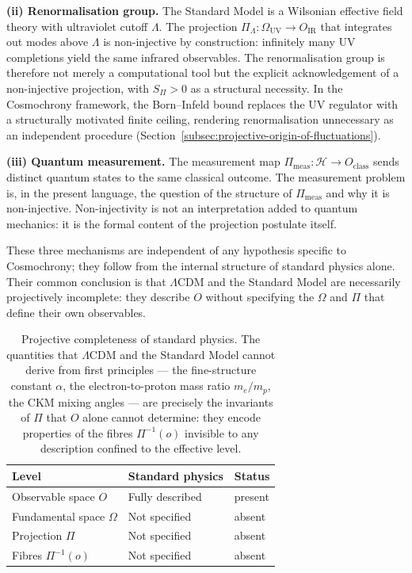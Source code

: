 \textbf{(ii) Renormalisation group.}
The Standard Model is a Wilsonian effective field theory with ultraviolet
cutoff $\Lambda$.
The projection $\Pi_\Lambda : \Omega_{\mathrm{UV}} \to O_{\mathrm{IR}}$
that integrates out modes above $\Lambda$ is non-injective by construction:
infinitely many UV completions yield the same infrared observables.
The renormalisation group is therefore not merely a computational tool but
the explicit acknowledgement of a non-injective projection, with $S_\Pi > 0$
as a structural necessity.
In the Cosmochrony framework, the Born--Infeld bound replaces the
UV regulator with a structurally motivated finite ceiling, rendering
renormalisation unnecessary as an independent procedure
(Section~\ref{subsec:projective-origin-of-fluctuations}).

\textbf{(iii) Quantum measurement.}
The measurement map $\Pi_{\mathrm{meas}} : \mathcal{H} \to O_{\mathrm{class}}$
sends distinct quantum states to the same classical outcome.
The measurement problem is, in the present language, the question of the
structure of $\Pi_{\mathrm{meas}}$ and why it is non-injective.
Non-injectivity is not an interpretation added to quantum mechanics: it is
the formal content of the projection postulate itself.

These three mechanisms are independent of any hypothesis specific to
Cosmochrony; they follow from the internal structure of standard physics
alone.
Their common conclusion is that $\Lambda$CDM and the Standard Model are
necessarily projectively incomplete: they describe $O$ without specifying
the $\Omega$ and $\Pi$ that define their own observables.

\begin{table}[ht]
  \centering
  \begin{tabular}{lll}
    \hline
    \textbf{Level} & \textbf{Standard physics} & \textbf{Status} \\
    \hline
    Observable space $O$        & Fully described   & present \\
    Fundamental space $\Omega$  & Not specified     & absent  \\
    Projection $\Pi$            & Not specified     & absent  \\
    Fibres $\Pi^{-1}(o)$        & Not specified     & absent  \\
    \hline
  \end{tabular}
  \caption{Projective completeness of standard physics.
  The quantities that $\Lambda$CDM and the Standard Model cannot
  derive from first principles --- the fine-structure constant $\alpha$,
  the electron-to-proton mass ratio $m_e/m_p$, the CKM mixing angles ---
  are precisely the invariants of $\Pi$ that $O$ alone cannot determine:
  they encode properties of the fibres $\Pi^{-1}(o)$ invisible to any
  description confined to the effective level.}
  \label{tab:projective-completeness}
\end{table}

